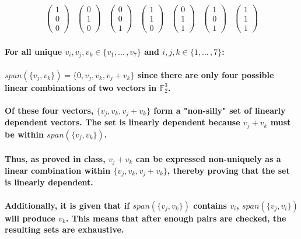 \documentclass{article}
\begin{document}
\begin{align}

\begin{pmatrix}
    1 \\ 0 \\ 0
\end{pmatrix}
&
\begin{pmatrix}
    0 \\ 1 \\ 0
\end{pmatrix}
&
\begin{pmatrix}
    0 \\ 0 \\ 1
\end{pmatrix}
&
\begin{pmatrix}
    1 \\ 1 \\ 0
\end{pmatrix}
&
\begin{pmatrix}
    0 \\ 1 \\ 1
\end{pmatrix}
&
\begin{pmatrix}
    1 \\ 0 \\ 1
\end{pmatrix}
&
\begin{pmatrix}
    1 \\ 1 \\ 1
\end{pmatrix}

\end{align}

\paragraph{\large
For all unique $v_i,v_j,v_k \in \{v_1, ...\,, v_7\}$ and $i,j,k \in \{1, ...\,, 7\}$:
\\\\$span(\{v_j, v_k\}) = \{0, v_j, v_k, v_j+v_k\}$ since there are only four possible linear combinations of two vectors in $\mathbb{F}_2^3$. 
\\\\Of these four vectors, $\{v_j, v_k, v_j + v_k\}$ form a "non-silly" set of linearly dependent vectors. The set is linearly dependent because $v_j + v_k$ must be within $span(\{v_j, v_k\})$. 
\\\\Thus, as proved in class, $v_j + v_k$ can be expressed non-uniquely as a linear combination within $\{v_j, v_k, v_j + v_k\}$, thereby proving that the set is linearly dependent.
\\\\Additionally, it is given that if $span(\{v_j, v_k\})$ contains $v_i$, $span(\{v_j, v_i\})$ will produce $v_k$. This means that after enough pairs are checked, the resulting sets are exhaustive.}
\end{document}
